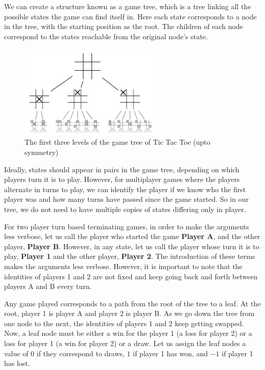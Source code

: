 \documentclass[12pt]{report}
\begin{document}
We can create a structure known as a game tree, which is a tree linking all the possible states the game can find itself in.
Here each state corresponds to a node in the tree, with the starting position as the root. The children of each node correspond to the states reachable from the original node's state.
\begin{figure}[h!]
    \centering
    \includegraphics[width=0.6\textwidth]{images/tic_tac_toe_game_tree.png}
    \caption{The first three levels of the game tree of Tic Tac Toe (upto symmetry)}
\end{figure}

Ideally, states should appear in pairs in the game tree, depending on which players turn it is to play. However, for multiplayer games where the players alternate in turns to play, we
can identify the player if we know who the first player was and how many turns have passed since the game started. So in our tree, we do not need to have multiple copies of states differing only in player.

For two player turn based terminating games, in order to make the arguments less verbose, let us call the player who started the game \textbf{Player A}, and the other player, \textbf{Player B}.
However, in any state, let us call the player whose turn it is to play, \textbf{Player 1} and the other player, \textbf{Player 2}. The introduction of these terms makes the arguments less verbose.
However, it is important to note that the identities of players 1 and 2 are not fixed and keep going back and forth between players A and B every turn.

Any game played corresponds to a path from the root of the tree to a leaf. At the root, player 1 is player A and player 2 is player B. As we go down the tree from one node to the next, the identities of players 1 and 2 keep getting swapped.
Now, a leaf node must be either a win for the player 1 (a loss for player 2) or a loss for player 1 (a win for player 2) or a draw.
Let us assign the leaf nodes a value of $0$ if they correspond to draws, $1$ if player 1 has won, and $-1$ if player 1 has lost. 
\end{document}
